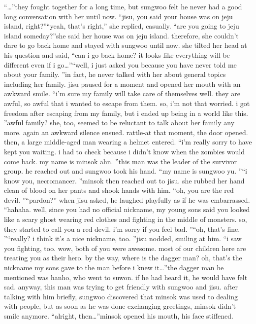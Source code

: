 “…”they fought together for a long time, but sungwoo felt he never had a good long conversation with her until now.
“jisu, you said your house was on jeju island, right?”“yeah, that’s right,” she replied, casually.
“are you going to jeju island someday?”she said her house was on jeju island.
 therefore, she couldn’t dare to go back home and stayed with sungwoo until now.
she tilted her head at his question and said, “can i go back home? it looks like everything will be different even if i go…”“well, i just asked you because you have never told me about your family.
”in fact, he never talked with her about general topics including her family.
jisu paused for a moment and opened her mouth with an awkward smile.
“i’m sure my family will take care of themselves well.
 they are awful, so awful that i wanted to escape from them.
 so, i’m not that worried.
 i got freedom after escaping from my family, but i ended up being in a world like this.
”awful family? she, too, seemed to be reluctant to talk about her family any more.
again an awkward silence ensued.
rattle-at that moment, the door opened.
 then, a large middle-aged man wearing a helmet entered.
“i’m really sorry to have kept you waiting.
 i had to check because i didn’t know when the zombies would come back.
 my name is minsok ahn.
”this man was the leader of the survivor group.
 he reached out and sungwoo took his hand.
“my name is sungwoo yu.
”“i know you, necromancer.
”minsok then reached out to jisu.
 she rubbed her hand clean of blood on her pants and shook hands with him.
“oh, you are the red devil.
”“pardon?”
when jisu asked, he laughed playfully as if he was embarrassed.
“hahaha.
 well, since you had no official nickname, my young sons said you looked like a scary ghost wearing red clothes and fighting in the middle of monsters.
 so, they started to call you a red devil.
 i’m sorry if you feel bad.
”“oh, that’s fine.
”“really? i think it’s a nice nickname, too.
”jisu nodded, smiling at him.
“i saw you fighting, too.
 wow, both of you were awesome.
 most of our children here are treating you as their hero.
 by the way, where is the dagger man? oh, that’s the nickname my sons gave to the man before i knew it…”the dagger man he mentioned was hanho, who went to suwon.
 if he had heard it, he would have felt sad.
anyway, this man was trying to get friendly with sungwoo and jisu.
 after talking with him briefly, sungwoo discovered that minsok was used to dealing with people, but as soon as he was done exchanging greetings, minsok didn’t smile anymore.
“alright, then…”minsok opened his mouth, his face stiffened.
